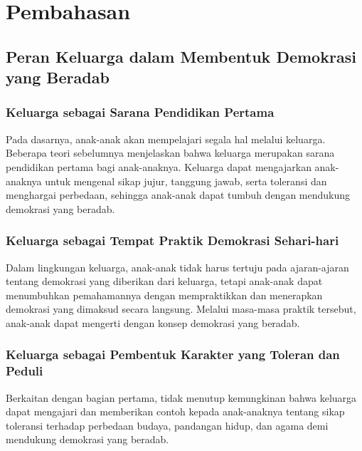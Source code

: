 \section{Pembahasan}


\subsection{Peran Keluarga dalam Membentuk Demokrasi yang Beradab}

\subsubsection{Keluarga sebagai Sarana Pendidikan Pertama}

Pada dasarnya, anak-anak akan mempelajari segala hal melalui keluarga. Beberapa teori sebelumnya menjelaskan bahwa keluarga merupakan sarana pendidikan pertama bagi anak-anaknya. Keluarga dapat mengajarkan anak-anaknya untuk mengenal sikap jujur, tanggung jawab, serta toleransi dan menghargai perbedaan, sehingga anak-anak dapat tumbuh dengan mendukung demokrasi yang beradab. 

\subsubsection{Keluarga sebagai Tempat Praktik Demokrasi Sehari-hari}

Dalam lingkungan keluarga, anak-anak tidak harus tertuju pada ajaran-ajaran tentang demokrasi yang diberikan dari keluarga, tetapi anak-anak dapat menumbuhkan pemahamannya dengan mempraktikkan dan menerapkan demokrasi yang dimaksud secara langsung. Melalui masa-masa praktik tersebut, anak-anak dapat mengerti dengan konsep demokrasi yang beradab.

\subsubsection{Keluarga sebagai Pembentuk Karakter yang Toleran dan Peduli}

Berkaitan dengan bagian pertama, tidak menutup kemungkinan bahwa keluarga dapat mengajari dan memberikan contoh kepada anak-anaknya tentang sikap toleransi terhadap perbedaan budaya, pandangan hidup, dan agama demi mendukung demokrasi yang beradab.


